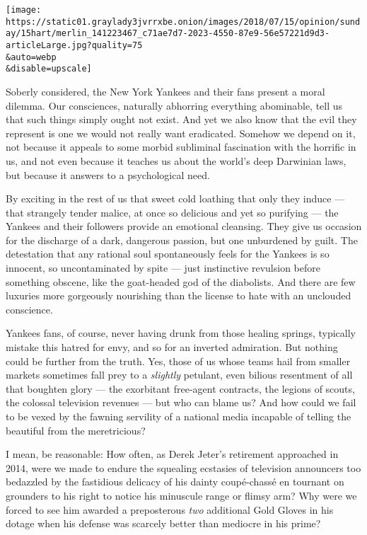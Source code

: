 \texttt{[image: https://static01.graylady3jvrrxbe.onion/images/2018/07/15/opinion/sunday/15hart/merlin\_141223467\_c71ae7d7-2023-4550-87e9-56e57221d9d3-articleLarge.jpg?quality=75\\\&auto=webp\\\&disable=upscale]}

Soberly considered, the New York Yankees and their fans present a moral
dilemma. Our consciences, naturally abhorring everything abominable,
tell us that such things simply ought not exist. And yet we also know
that the evil they represent is one we would not really want eradicated.
Somehow we depend on it, not because it appeals to some morbid
subliminal fascination with the horrific in us, and not even because it
teaches us about the world's deep Darwinian laws, but because it answers
to a psychological need.

By exciting in the rest of us that sweet cold loathing that only they
induce --- that strangely tender malice, at once so delicious and yet so
purifying --- the Yankees and their followers provide an emotional
cleansing. They give us occasion for the discharge of a dark, dangerous
passion, but one unburdened by guilt. The detestation that any rational
soul spontaneously feels for the Yankees is so innocent, so
uncontaminated by spite --- just instinctive revulsion before something
obscene, like the goat-headed god of the diabolists. And there are few
luxuries more gorgeously nourishing than the license to hate with an
unclouded conscience.

Yankees fans, of course, never having drunk from those healing springs,
typically mistake this hatred for envy, and so for an inverted
admiration. But nothing could be further from the truth. Yes, those of
us whose teams hail from smaller markets sometimes fall prey to a
\emph{slightly} petulant, even bilious resentment of all that boughten
glory --- the exorbitant free-agent contracts, the legions of scouts,
the colossal television revenues --- but who can blame us? And how could
we fail to be vexed by the fawning servility of a national media
incapable of telling the beautiful from the meretricious?

I mean, be reasonable: How often, as Derek Jeter's retirement approached
in 2014, were we made to endure the squealing ecstasies of television
announcers too bedazzled by the fastidious delicacy of his dainty
coupé-chassé en tournant on grounders to his right to notice his
minuscule range or flimsy arm? Why were we forced to see him awarded a
preposterous \emph{two} additional Gold Gloves in his dotage when his
defense was scarcely better than mediocre in his prime?

